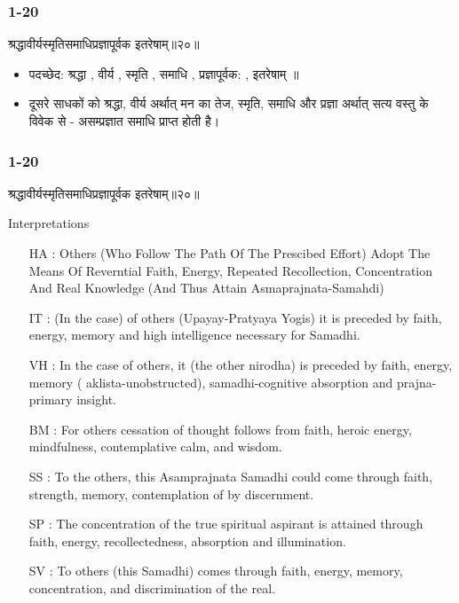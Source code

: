 \begin{frame}[fragile]\frametitle{1-20}
\begin{sanskrit}
श्रद्धावीर्यस्मृतिसमाधिप्रज्ञापूर्वक इतरेषाम्॥२०॥
\end{sanskrit}

\begin{itemize}
\item पदच्छेद: श्रद्धा , वीर्य , स्मृति , समाधि , प्रज्ञापूर्वक: , इतरेषाम् ॥
\item दूसरे साधकों को श्रद्धा, वीर्य अर्थात् मन का तेज, स्मृति, समाधि और प्रज्ञा अर्थात् सत्य वस्तु के विवेक से - असम्प्रज्ञात समाधि प्राप्त होती है।
\end{itemize}

\end{frame}


\begin{frame}[fragile]\frametitle{1-20}
\begin{sanskrit}
श्रद्धावीर्यस्मृतिसमाधिप्रज्ञापूर्वक इतरेषाम्॥२०॥
\end{sanskrit}

Interpretations
\begin{itemize}	
\item [HA]: Others (Who Follow The Path Of The Prescibed Effort) Adopt The Means Of Reverntial Faith, Energy, Repeated Recollection, Concentration And Real Knowledge (And Thus Attain Asmaprajnata-Samahdi)
\item [IT]: (In the case) of others (Upayay-Pratyaya Yogis) it is preceded by faith, energy, memory and high intelligence necessary for Samadhi.
\item [VH]: In the case of others, it (the other nirodha) is preceded by faith, energy, memory ( aklista-unobstructed), samadhi-cognitive absorption and prajna-primary insight.
\item [BM]: For others cessation of thought follows from faith, heroic energy, mindfulness, contemplative calm, and wisdom.
\item [SS]: To the others, this Asamprajnata Samadhi could come through faith, strength, memory, contemplation of by discernment.
\item [SP]: The concentration of the true spiritual aspirant is attained through faith, energy, recollectedness, absorption and illumination.
\item [SV]: To others (this Samadhi) comes through faith, energy, memory, concentration, and discrimination of the real. 
\end{itemize}
	
\end{frame}

